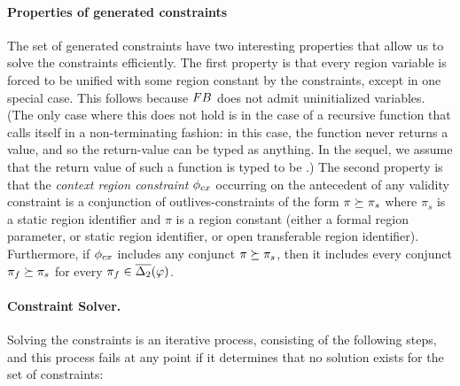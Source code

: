 \paragraph{Properties of generated constraints}
The set of generated constraints have two interesting properties that allow us to
solve the constraints efficiently.
%
The first property is that every region variable is forced to be unified with some
region constant by the constraints, except in one special case.
This follows because ${\sc FB}$ does not admit uninitialized variables.
(The only case where this does not hold is in the case of a recursive function
that calls itself in a non-terminating fashion: in this case, the function never
returns a value, and so the return-value can be typed as anything. In the sequel,
we assume that the return value of such a function is typed to be .)
%
The second property is that the \emph{context region constraint} $\phi_{cx}$
occurring on the antecedent of any validity constraint is a conjunction of
outlives-constraints of the form $\pi \succeq \pi_s$ where $\pi_s$
is a static region identifier and $\pi$ is a region constant (either a formal
region parameter, or static region identifier, or open transferable region identifier).
Furthermore, if $\phi_{cx}$ includes any conjunct $\pi \succeq \pi_s$, then
it includes every conjunct $\pi_f \succeq \pi_s$ for every $\pi_f \in \overline{\Delta_2}(\varphi)$.

\paragraph{Constraint Solver.}
Solving the constraints is an iterative process, consisting of the following
steps, and this process fails at any point if it determines that no solution
exists for the set of constraints:

